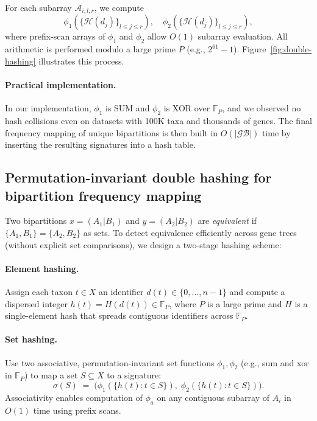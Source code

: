 \documentclass[10pt,a4paper]{article}
\begin{document}
\begin{enumerate}
For each subarray $\mathcal{A}_{i,l,r}$, we compute
\[
\phi_1(\{\mathcal{H}(d_j)\}_{l \le j \le r}), \quad
\phi_2(\{\mathcal{H}(d_j)\}_{l \le j \le r}),
\]
where prefix-scan arrays of $\phi_1$ and $\phi_2$ allow $O(1)$ subarray evaluation. All arithmetic is performed modulo a large prime $P$ (e.g., $2^{61}-1$). Figure~\ref{fig:double-hashing} illustrates this process.

\paragraph{Practical implementation.}
In our implementation, $\phi_1$ is SUM and $\phi_2$ is XOR over $\mathbb{F}_P$, and we observed no hash collisions even on datasets with 100K taxa and thousands of genes. The final frequency mapping of unique bipartitions is then built in $O(|\mathcal{GB}|)$ time by inserting the resulting signatures into a hash table.





\subsection{Permutation-invariant double hashing for bipartition frequency mapping}
\label{subsec:hash}

Two bipartitions $x=(A_1\!|\!B_1)$ and $y=(A_2\!|\!B_2)$ are \emph{equivalent} if $\{A_1,B_1\}=\{A_2,B_2\}$ as sets. To detect equivalence efficiently across gene trees (without explicit set comparisons), we design a two-stage hashing scheme:

\paragraph{Element hashing.} Assign each taxon $t\in X$ an identifier $d(t)\in\{0,\dots,n-1\}$ and compute a dispersed integer $h(t)=H(d(t))\in\mathbb{F}_P$, where $P$ is a large prime and $H$ is a single-element hash that spreads contiguous identifiers across $\mathbb{F}_P$.

\paragraph{Set hashing.} Use two associative, permutation-invariant set functions $\phi_1,\phi_2$ (e.g., sum and xor in $\mathbb{F}_P$) to map a set $S\subseteq X$ to a signature:
\[
\sigma(S)\;=\;\big(\phi_1(\{h(t):t\in S\}),\;\phi_2(\{h(t):t\in S\})\big).
\]
Associativity enables computation of $\phi_a$ on any contiguous subarray of $A_i$ in $O(1)$ time using prefix scans.


\end{enumerate}
\end{document}
